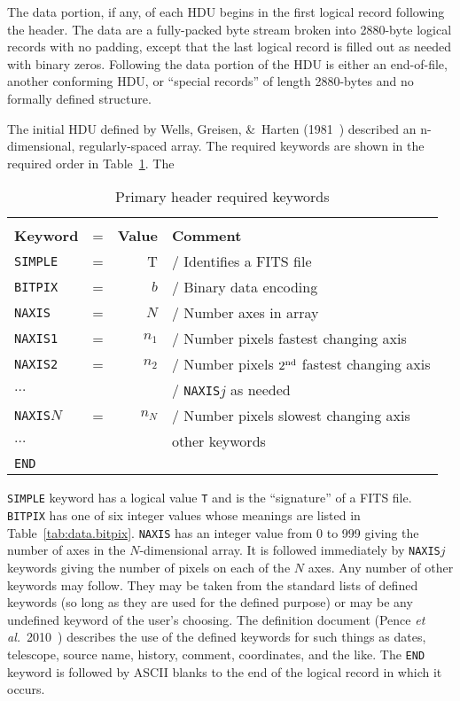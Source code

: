 \documentclass[twoside]{article}
\newcommand{\etal}{{\it et al.}}
\newcommand{\tablerowgapbefore}{-1ex}
\newcommand{\tablerowgapafter}{1ex}
\newcommand{\keyw}[1]{\hbox{{\tt #1}}}
\begin{document}
The data portion, if any, of each HDU begins in the first logical
record following the header.  The data are a fully-packed byte stream
broken into 2880-byte logical records with no padding, except that the
last logical record is filled out as needed with binary zeros.
Following the data portion of the HDU is either an end-of-file,
another conforming HDU, or ``special records'' of length 2880-bytes
and no formally defined structure.

The initial HDU defined by Wells, Greisen, \&\ Harten
(1981~\cite{WGH81}) described an n-dimensional, regularly-spaced
array.  The required keywords are shown in the required order in
Table~\ref{tab:data.basickeys}.  The
\begin{table}
\caption{Primary header required keywords}
\label{tab:data.basickeys}
\begin{center}
\begin{tabular}{|lrrl|}
\cline{1-4}
&  & & \\ [\tablerowgapbefore]
{\bf Keyword} & = & {\bf Value} & {\bf Comment} \\ [\tablerowgapafter]
\keyw{SIMPLE} & = & T     & / Identifies a FITS file \\
\keyw{BITPIX} & = & $ b$  & / Binary data encoding \\
\keyw{NAXIS}  & = & $N$   & / Number axes in array \\
\keyw{NAXIS1} & = & $n_1$ & / Number pixels fastest changing axis \\
\keyw{NAXIS2} & = & $n_2$ & / Number pixels $2^{\rm nd}$ fastest
                             changing axis \\
$\ldots$     &   &       & / \keyw{NAXIS$j$} as needed \\
\keyw{NAXIS$N$} & = & $n_N$ & / Number pixels slowest changing axis \\
$\ldots$     &   &       & other keywords \\
\keyw{END}    &   &       & \\ [\tablerowgapafter] \cline{1-4}
\end{tabular}
\end{center}
\end{table}
\keyw{SIMPLE} keyword has a logical value \keyw{T} and is the
``signature'' of a FITS file.  \keyw{BITPIX} has one of six integer
values whose meanings are listed in Table~\ref{tab:data.bitpix}.
\keyw{NAXIS} has an integer value from 0 to 999 giving the number of
axes in the $N$-dimensional array.  It is followed immediately by
\keyw{NAXIS$j$} keywords giving the number of pixels on each of the
$N$ axes.  Any number of other keywords may follow.  They may be taken
from the standard lists of defined keywords (so long as they are used
for the defined purpose) or may be any undefined keyword of the user's
choosing.  The definition document (Pence \etal~2010~\cite{PCPSS10})
describes the use of the defined keywords for such things as dates,
telescope, source name, history, comment, coordinates, and the like.
The \keyw{END} keyword is followed by ASCII blanks to the end of the
logical record in which it occurs.
\vfill\eject
\end{document}
